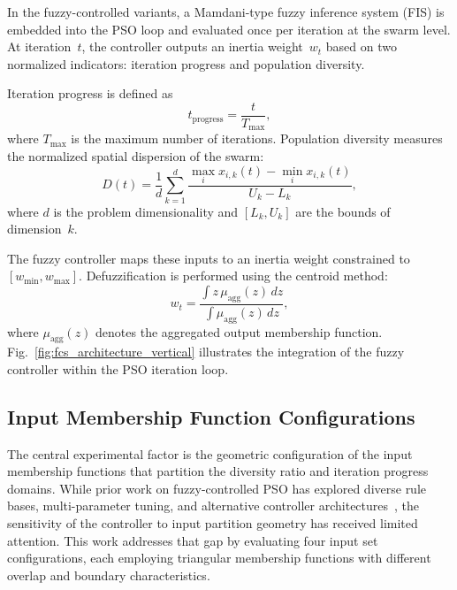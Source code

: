 In the fuzzy-controlled variants, a Mamdani-type fuzzy inference system (FIS) is embedded into the PSO loop and evaluated once per iteration at the swarm level. At iteration~$t$, the controller outputs an inertia weight~$w_t$ based on two normalized indicators: iteration progress and population diversity.

Iteration progress is defined as
\begin{equation}
    t_{\text{progress}} = \frac{t}{T_{\max}},
    \label{eq:iteration_progress}
\end{equation}
where $T_{\max}$ is the maximum number of iterations. Population diversity measures the normalized spatial dispersion of the swarm:
\begin{equation}
    D(t) = \frac{1}{d} \sum_{k=1}^{d}
    \frac{\max_i x_{i,k}(t) - \min_i x_{i,k}(t)}{U_k - L_k},
    \label{eq:diversity_metric}
\end{equation}
where $d$ is the problem dimensionality and $[L_k, U_k]$ are the bounds of dimension~$k$.

The fuzzy controller maps these inputs to an inertia weight constrained to $[w_{\min}, w_{\max}]$. Defuzzification is performed using the centroid method:
\begin{equation}
    w_t = \frac{\int z \, \mu_{\text{agg}}(z)\, dz}{\int \mu_{\text{agg}}(z)\, dz},
    \label{eq:defuzzification}
\end{equation}
where $\mu_{\text{agg}}(z)$ denotes the aggregated output membership function. Fig.~\ref{fig:fcs_architecture_vertical} illustrates the integration of the fuzzy controller within the PSO iteration loop.




\subsection{Input Membership Function Configurations}
\label{subsec:input_mf_configs}

The central experimental factor is the geometric configuration of the input membership functions that partition the diversity ratio and iteration progress domains. While prior work on fuzzy-controlled PSO has explored diverse rule bases, multi-parameter tuning, and alternative controller architectures~\cite{shi2001fuzzy, nobile2018fuzzy, xia2022particle}, the sensitivity of the controller to input partition geometry has received limited attention. This work addresses that gap by evaluating four input set configurations, each employing triangular membership functions with different overlap and boundary characteristics.


